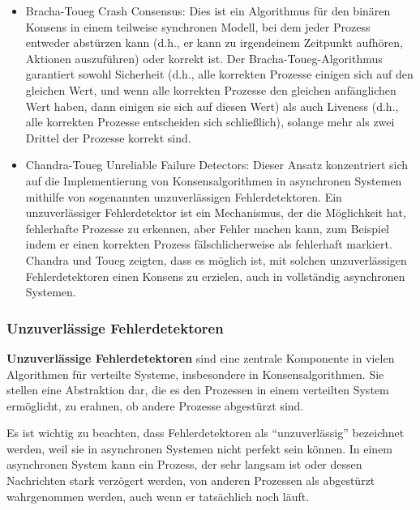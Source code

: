 \begin{itemize}
\item Bracha-Toueg Crash Consensus: Dies ist ein Algorithmus für den binären Konsens in einem teilweise synchronen Modell, bei dem jeder Prozess entweder abstürzen kann (d.h., er kann zu irgendeinem Zeitpunkt aufhören, Aktionen auszuführen) oder korrekt ist. Der Bracha-Toueg-Algorithmus garantiert sowohl Sicherheit (d.h., alle korrekten Prozesse einigen sich auf den gleichen Wert, und wenn alle korrekten Prozesse den gleichen anfänglichen Wert haben, dann einigen sie sich auf diesen Wert) als auch Liveness (d.h., alle korrekten Prozesse entscheiden sich schließlich), solange mehr als zwei Drittel der Prozesse korrekt sind.
\item Chandra-Toueg Unreliable Failure Detectors: Dieser Ansatz konzentriert sich auf die Implementierung von Konsensalgorithmen in asynchronen Systemen mithilfe von sogenannten unzuverlässigen Fehlerdetektoren. Ein unzuverlässiger Fehlerdetektor ist ein Mechanismus, der die Möglichkeit hat, fehlerhafte Prozesse zu erkennen, aber Fehler machen kann, zum Beispiel indem er einen korrekten Prozess fälschlicherweise als fehlerhaft markiert. Chandra und Toueg zeigten, dass es möglich ist, mit solchen unzuverlässigen Fehlerdetektoren einen Konsens zu erzielen, auch in vollständig asynchronen Systemen.
\end{itemize}   

\subsubsection{Unzuverlässige Fehlerdetektoren} 
\textbf{Unzuverlässige Fehlerdetektoren} sind eine zentrale Komponente in vielen Algorithmen für verteilte Systeme, insbesondere in Konsensalgorithmen. Sie stellen eine Abstraktion dar, die es den Prozessen in einem verteilten System ermöglicht, zu erahnen, ob andere Prozesse abgestürzt sind.

Es ist wichtig zu beachten, dass Fehlerdetektoren als \enquote{unzuverlässig} bezeichnet werden, weil sie in asynchronen Systemen nicht perfekt sein können. In einem asynchronen System kann ein Prozess, der sehr langsam ist oder dessen Nachrichten stark verzögert werden, von anderen Prozessen als abgestürzt wahrgenommen werden, auch wenn er tatsächlich noch läuft.
